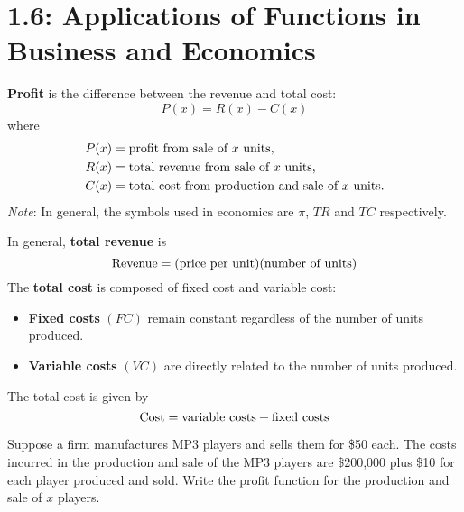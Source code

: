 \documentclass[../mathNotesPreamble]{subfiles}
\begin{document}
  \section{1.6: Applications of Functions in Business and Economics}
  \begin{defn*}
    \textbf{Profit} is the difference between the revenue and total cost:
      \[P(x)=R(x)-C(x)\]
    where
      \begin{align*}
        P(x)&= \textnormal{profit from sale of $x$ units,}\\
        R(x)&= \textnormal{total revenue from sale of $x$ units,}\\
        C(x)&= \textnormal{total cost from production and sale of $x$ units.}
      \end{align*}
    \emph{Note}: In general, the symbols used in economics are $\pi$, $TR$ and $TC$ respectively.

    \vspace*{\baselineskip}
    In general, \textbf{total revenue} is
      \[\textnormal{Revenue}={\left(\textnormal{price per unit}\right)}{\left(\textnormal{number of units}\right)}\]
    The \textbf{total cost} is composed of fixed cost and variable cost:
    \begin{itemize}
      \item \textbf{Fixed costs} $(FC)$ remain constant regardless of the number of units produced.
      \item \textbf{Variable costs} $(VC)$ are directly related to the number of units produced.
    \end{itemize}
    The total cost is given by
      \[\textnormal{Cost}=\textnormal{variable costs}+\textnormal{fixed costs}\]
  \end{defn*}
  \pagebreak

  \begin{ex*}
    Suppose a firm manufactures MP3 players and sells them for \$50 each. The costs incurred in the production and sale of the MP3 players are \$200,000 plus \$10 for each player produced and sold. Write the profit function for the production and sale of $x$ players.
  \end{ex*}
\end{document}
